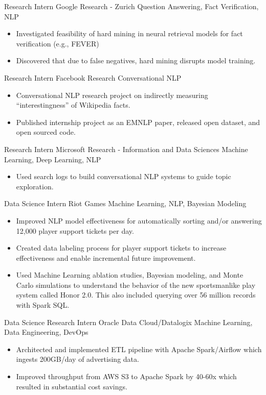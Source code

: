 \documentclass[11pt,a4paper,sans]{moderncv} %
\begin{document}
		{Research Intern}
		{Google Research - Zurich}
		{Question Answering, Fact Verification, NLP}
		{}
		{
			\begin{itemize}
				\item Investigated feasibility of hard mining in neural retrieval models for fact verification (e.g., FEVER)
				\item Discovered that due to false negatives, hard mining disrupts model training.
			\end{itemize}
		}

		{Research Intern}
		{Facebook Research}
		{Conversational NLP}
		{}
		{
			\begin{itemize}
				\item Conversational NLP research project on indirectly measuring ``interestingness'' of Wikipedia facts.
				\item Published internship project as an EMNLP paper, released open dataset, and open sourced code.
			\end{itemize}
		}

		{Research Intern}
		{Microsoft Research - Information and Data Sciences}
		{Machine Learning, Deep Learning, NLP}
		{}
		{
			\begin{itemize}
			\item Used search logs to build conversational NLP systems to guide topic exploration.
			\end{itemize}
		}
		{Data Science Intern}
		{Riot Games}
		{Machine Learning, NLP, Bayesian Modeling}
		{}
		{
			\begin{itemize}
			\item Improved NLP model effectiveness for automatically sorting and/or answering 12,000 player support tickets per day.
			\item Created data labeling process for player support tickets to increase effectiveness and enable incremental future improvement.
			\item Used Machine Learning ablation studies, Bayesian modeling, and Monte Carlo simulations to understand the behavior of the new sportsmanlike play system called Honor 2.0. This also included querying over 56 million records with Spark SQL.
			\end{itemize}
		}

		{Data Science Research Intern}
		{Oracle Data Cloud/Datalogix}
		{Machine Learning, Data Engineering, DevOps}
		{}
		{
			\begin{itemize}
			\item Architected and implemented ETL pipeline with Apache Spark/Airflow which ingests 200GB/day of advertising data.
			\item Improved throughput from AWS S3 to Apache Spark by 40-60x which resulted in substantial cost savings.
			\end{itemize}
		}
\end{document}

